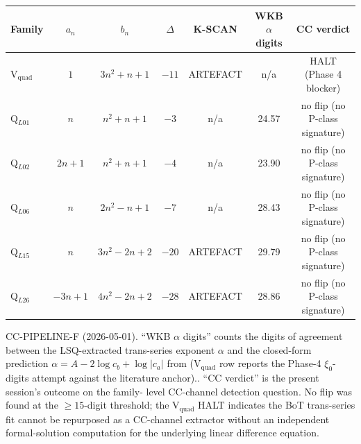 \begin{center}
\renewcommand{\arraystretch}{1.2}
\begin{tabular}{lcccccc}
\hline
Family & $a_n$ & $b_n$ & $\Delta$ & K-SCAN & WKB $\alpha$ digits & CC verdict \\
\hline
V$_{\mathrm{quad}}$ & $1$ & $3n^{2}+n+1$ & $-11$ & ARTEFACT & n/a & HALT (Phase 4 blocker) \\
Q$_{L01}$ & $n$ & $n^{2}+n+1$ & $-3$ & n/a & 24.57 & no flip (no P-class signature) \\
Q$_{L02}$ & $2n+1$ & $n^{2}+n+1$ & $-4$ & n/a & 23.90 & no flip (no P-class signature) \\
Q$_{L06}$ & $n$ & $2n^{2}-n+1$ & $-7$ & n/a & 28.43 & no flip (no P-class signature) \\
Q$_{L15}$ & $n$ & $3n^{2}-2n+2$ & $-20$ & ARTEFACT & 29.79 & no flip (no P-class signature) \\
Q$_{L26}$ & $-3n+1$ & $4n^{2}-2n+2$ & $-28$ & ARTEFACT & 28.86 & no flip (no P-class signature) \\
\hline
\end{tabular}
\end{center}

\noindent CC-PIPELINE-F (2026-05-01).  ``WKB $\alpha$ digits''
counts the digits of agreement between the LSQ-extracted
trans-series exponent $\alpha$ and the closed-form prediction
$\alpha = A - 2\log c_{b} + \log|c_{a}|$ from
\cite{siarc_borel_kscan} (V$_{\mathrm{quad}}$ row reports the
Phase-4 $\xi_{0}$-digits attempt against the literature anchor)..
``CC verdict'' is the present session's outcome on the family-
level CC-channel detection question.  No flip was found at the
$\geq 15$-digit threshold; the V$_{\mathrm{quad}}$ HALT
indicates the BoT trans-series fit cannot be repurposed as a
CC-channel extractor without an independent formal-solution
computation for the underlying linear difference equation.
